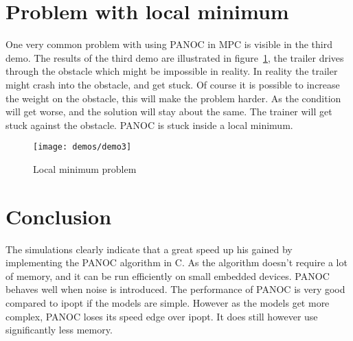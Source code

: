 \section{Problem with local minimum}
One very common problem with using PANOC in MPC is visible in the third demo. The results of the third demo are illustrated in figure~\ref{fig:demo: local minimum problem}, the trailer drives through the obstacle which might be impossible in reality. In reality the trailer might crash into the obstacle, and get stuck. Of course it is possible to increase the weight on the obstacle, this will make the problem harder. As the condition will get worse, and the solution will stay about the same. The trainer will get stuck against the obstacle. PANOC is stuck inside a local minimum.

\begin{figure}[H]
	\centering
	\texttt{[image: demos/demo3]}
	\caption{Local minimum problem}
	\label{fig:demo: local minimum problem}
\end{figure}

\section{Conclusion}

The simulations clearly indicate that a great speed up his gained by implementing the PANOC algorithm in C. As the algorithm doesn't require a lot of memory, and it can be run efficiently on small embedded devices. PANOC behaves well when noise is introduced. The performance of PANOC is very good compared to ipopt if the models are simple. However as the models get more complex, PANOC loses its speed edge over ipopt. It does still however use significantly less memory.